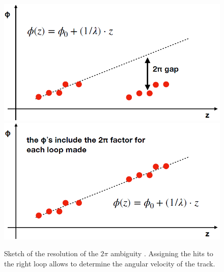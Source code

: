 \documentclass[12pt,a4paper,openright, oneside, titlepage]{book} %
\begin{document}
\begin{figure}[h!]
\centering
\includegraphics[scale=0.55]{giani_TrkPatRec_ambiguity0}
\includegraphics[scale=0.55]{giani_TrkPatRec_ambiguity1}
\caption{Sketch of the resolution of the $2\pi$ ambiguity \cite{GianiPatRec:2020}. 
Assigning the hits to the right loop allows to determine the angular velocity of the track.}
\label{_TrkPatRec_ambiguity}
\end{figure}
\end{document}
